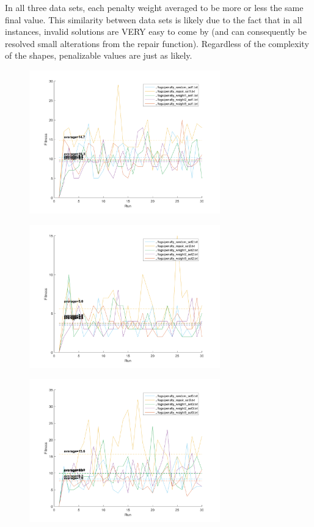 \documentclass[11pt]{article}
\begin{document}
In all three data sets, each penalty weight averaged to be more or less the same final value. This similarity between data sets is likely due to the fact that in all instances, invalid solutions are VERY easy to come by (and can consequently be resolved small alterations from the repair function). Regardless of the complexity of the shapes, penalizable values are just as likely.

\begin{figure}[h]
\begin{minipage}{.5\textwidth}
  \includegraphics[width=3.25in]{assn1c_graph_penalty_set1.png}
  \label{fig:penaltyset1}
\end{minipage}%
\begin{minipage}{.5\textwidth}
  \includegraphics[width=3.25in]{assn1c_graph_penalty_set2.png}
  \label{fig:penaltyset2}
\end{minipage}
\end{figure}
\begin{figure}[h]
	\centering
  \includegraphics[width=3.25in]{assn1c_graph_penalty_set3.png}
  \label{fig:penaltyset3}
\end{figure}
\end{document}

